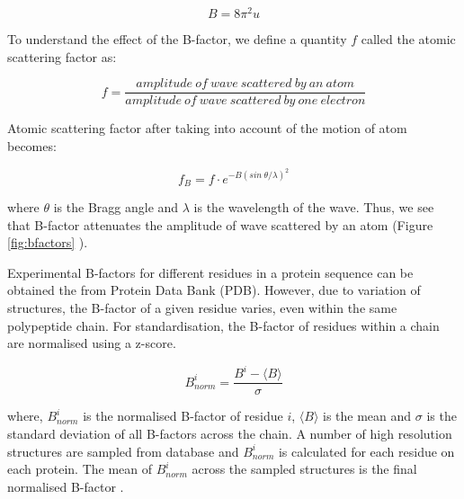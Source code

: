 \begin{equation}
    B = 8\pi^2 u
    \label{eqn:bfactor}
\end{equation}

To understand the effect of the B-factor, we define a quantity $f$ called the atomic scattering factor as:

\begin{equation}
    f = \frac{amplitude\ of\ wave\ scattered\ by\ an\ atom}{amplitude\ of\ wave\ scattered\ by\ one\ electron}
\end{equation}

Atomic scattering factor after taking into account of the motion of atom becomes:

\begin{equation}
    f_B = f\cdot e^{-B(sin\ \theta /\lambda)^2}
\end{equation}

where $\theta$ is the Bragg angle and $\lambda$ is the wavelength of the wave. Thus, we see that B-factor attenuates the amplitude of wave scattered by an atom (Figure \ref{fig:bfactors} ).


Experimental B-factors for different residues in a protein sequence can be obtained the from Protein Data Bank (PDB). However, due to variation of structures, the B-factor of a given residue varies, even within the same polypeptide chain. For standardisation, the B-factor of residues within a chain are normalised using a z-score.

\begin{equation}
    B_{norm}^i =  \frac{B^i - \langle B\rangle}{\sigma}
\end{equation}

where, $B_{norm}^i$ is the normalised B-factor of residue $i$, $\langle B\rangle$ is the mean and $\sigma$ is the standard deviation of all B-factors across the chain. A number of high resolution structures are sampled from database and $B_{norm}^i$ is calculated for each residue on each protein. The mean of $B_{norm}^i$ across the sampled structures is the final normalised B-factor \cite{Schlessinger2005-ps, Smith2003-gb, Karplus1985-ea, vihinen1994accuracy}. 


